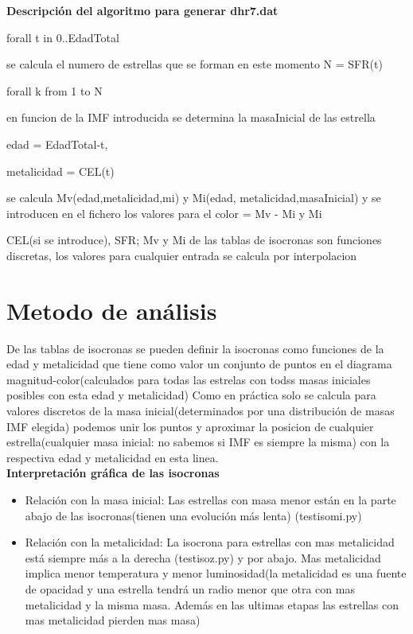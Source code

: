 \documentclass[10pt]{book}
\begin{document}
\textbf{Descripción del algoritmo para generar dhr7.dat}
\begin{description}
\item forall t in 0..EdadTotal
\begin{description}
	\item se calcula  el numero de estrellas que se forman en este momento N = SFR(t)
	\item forall k from 1 to N
		\begin{description}
			\item en funcion de la IMF introducida se determina la masaInicial de las estrella 
			\item edad = EdadTotal-t, 
			\item metalicidad = CEL(t)
			\item se calcula Mv(edad,metalicidad,mi) y Mi(edad, metalicidad,masaInicial) y se introducen en el fichero los valores para el color = Mv - Mi y Mi \\
			
	
		\end{description}
			
\end{description}
\item CEL(si se introduce), SFR; Mv y Mi de las tablas de isocronas son funciones discretas, los valores para cualquier entrada se calcula por interpolacion 
\end{description}

\section*{Metodo de análisis}

De las tablas de isocronas se pueden definir la isocronas como  funciones de la edad y metalicidad  que tiene como valor un conjunto de puntos en el diagrama  magnitud-color(calculados para todas las estrelas con todss masas iniciales posibles con esta edad y metalicidad) Como en práctica solo se calcula para valores discretos de la masa inicial(determinados por una distribución de masas IMF elegida) podemos unir los puntos y aproximar la posicion de cualquier estrella(cualquier masa inicial: no sabemos si IMF es siempre la misma) con la respectiva edad y metalicidad  en esta linea.\\

\textbf{Interpretación gráfica de las isocronas}
\begin{itemize}
\item Relación con la masa inicial: Las estrellas con masa menor están en la parte abajo de las isocronas(tienen una evolución más lenta) (testisomi.py)
\item Relación con la metalicidad: La isocrona para estrellas con mas metalicidad está siempre más a la derecha (testisoz.py)
y por abajo.
Mas metalicidad implica menor temperatura y menor luminosidad(la metalicidad es una fuente de opacidad y  una estrella tendrá un radio menor que otra con mas metalicidad y la misma masa. Además en las ultimas etapas las estrellas con mas metalicidad pierden mas masa)
\end{itemize}
\end{document}
